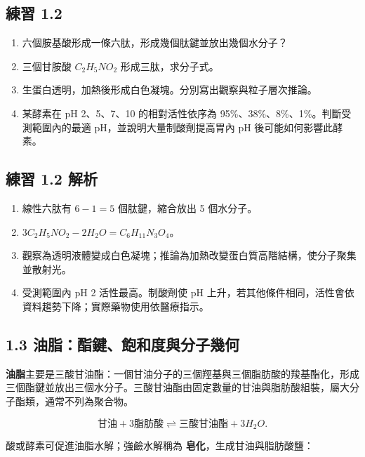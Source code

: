 \documentclass[11pt,a4paper]{article}
\providecommand{\tightlist}{%
  \setlength{\itemsep}{0pt}\setlength{\parskip}{0pt}}
\begin{document}
\subsection{練習 1.2}\label{ux7df4ux7fd2-1.2}

\begin{enumerate}
\def\labelenumi{\arabic{enumi}.}
\tightlist
\item
  六個胺基酸形成一條六肽，形成幾個肽鍵並放出幾個水分子？
\item
  三個甘胺酸 \(C_2H_5NO_2\) 形成三肽，求分子式。
\item
  生蛋白透明，加熱後形成白色凝塊。分別寫出觀察與粒子層次推論。
\item
  某酵素在 pH 2、5、7、10 的相對活性依序為 95\%、38\%、8\%、1\%。判斷受測範圍內的最適 pH，並說明大量制酸劑提高胃內 pH 後可能如何影響此酵素。
\end{enumerate}

\subsection{練習 1.2 解析}\label{ux7df4ux7fd2-1.2-ux89e3ux6790}

\begin{enumerate}
\def\labelenumi{\arabic{enumi}.}
\tightlist
\item
  線性六肽有 \(6-1=5\) 個肽鍵，縮合放出 5 個水分子。
\item
  \(3C_2H_5NO_2-2H_2O=C_6H_{11}N_3O_4\)。
\item
  觀察為透明液體變成白色凝塊；推論為加熱改變蛋白質高階結構，使分子聚集並散射光。
\item
  受測範圍內 pH 2 活性最高。制酸劑使 pH 上升，若其他條件相同，活性會依資料趨勢下降；實際藥物使用依醫療指示。
\end{enumerate}

\subsection{1.3 油脂：酯鍵、飽和度與分子幾何}\label{ux6cb9ux8102ux916fux9375ux98fdux548cux5ea6ux8207ux5206ux5b50ux5e7eux4f55}

\textbf{油脂}主要是三酸甘油酯：一個甘油分子的三個羥基與三個脂肪酸的羧基酯化，形成三個酯鍵並放出三個水分子。三酸甘油酯由固定數量的甘油與脂肪酸組裝，屬大分子酯類，通常不列為聚合物。

\[
\text{甘油}+3\text{脂肪酸}\rightleftharpoons\text{三酸甘油酯}+3H_2O.
\]

酸或酵素可促進油脂水解；強鹼水解稱為 \textbf{皂化}，生成甘油與脂肪酸鹽：
\end{document}
